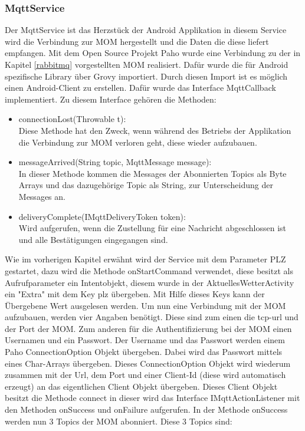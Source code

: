 \subsubsection{MqttService}
\label{subsubsec:MqttService}
Der MqttService ist das Herzstück der Android Applikation in diesem Service wird die Verbindung zur MOM hergestellt und die Daten die diese liefert empfangen.
Mit dem Open Source Projekt Paho wurde eine Verbindung zu der in Kapitel \ref{rabbitmq} vorgestellten MOM realisiert. Dafür wurde die für Android spezifische Library über Grovy importiert. Durch diesen Import ist es möglich einen Android-Client zu erstellen. Dafür wurde das Interface MqttCallback implementiert. Zu diesem Interface gehören die Methoden: 
 \begin{itemize}
\item connectionLost(Throwable t):
\\Diese Methode hat den Zweck, wenn während des Betriebs der Applikation die Verbindung zur MOM verloren geht, diese wieder aufzubauen.
\item messageArrived(String topic, MqttMessage message):
\\In dieser Methode kommen die Messages der Abonnierten Topics als Byte Arrays und das dazugehörige Topic als String, zur Unterscheidung der Messages an.
\item deliveryComplete(IMqttDeliveryToken token):
\\Wird aufgerufen, wenn die Zustellung für eine Nachricht abgeschlossen ist und alle Bestätigungen eingegangen sind.
\end{itemize}
Wie im vorherigen Kapitel erwähnt wird der Service mit dem Parameter PLZ gestartet, dazu wird die Methode onStartCommand verwendet, diese besitzt als Aufrufparameter ein Intentobjekt, diesem wurde in der AktuellesWetterActivity ein "Extra" mit dem Key plz übergeben. Mit Hilfe dieses Keys kann der Übergebene Wert ausgelesen werden. Um nun eine Verbindung mit der MOM aufzubauen, werden vier Angaben benötigt. Diese sind zum einen die tcp-url und der Port der MOM. Zum anderen für die Authentifizierung bei der MOM einen Usernamen und ein Passwort. Der Username und das Passwort werden einem Paho ConnectionOption Objekt übergeben. Dabei wird das Passwort mittels eines Char-Arrays übergeben. Dieses ConnectionOption Objekt wird wiederum zusammen mit der Url, dem Port und einer Client-Id (diese wird automatisch erzeugt) an das eigentlichen Client Objekt übergeben. Dieses Client Objekt besitzt die Methode connect in dieser wird das Interface IMqttActionListener mit den Methoden onSuccess und onFailure aufgerufen. In der Methode onSuccess werden nun 3 Topics der MOM abonniert. Diese 3 Topics sind:
